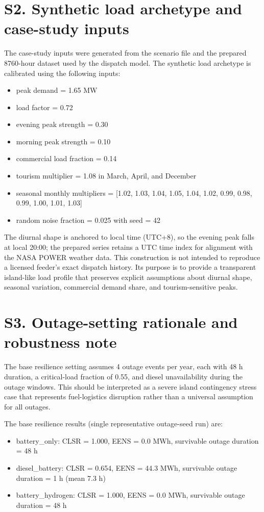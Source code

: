 \documentclass[11pt]{article}
\begin{document}
\section*{S2. Synthetic load archetype and case-study inputs}
The case-study inputs were generated from the scenario file and the prepared 8760-hour dataset used by the dispatch model. The synthetic load archetype is calibrated using the following inputs:
\begin{itemize}[leftmargin=1.5em]
  \item peak demand = 1.65 MW
  \item load factor = 0.72
  \item evening peak strength = 0.30
  \item morning peak strength = 0.10
  \item commercial load fraction = 0.14
  \item tourism multiplier = 1.08 in March, April, and December
  \item seasonal monthly multipliers = [1.02, 1.03, 1.04, 1.05, 1.04, 1.02, 0.99, 0.98, 0.99, 1.00, 1.01, 1.03]
  \item random noise fraction = 0.025 with seed = 42
\end{itemize}

The diurnal shape is anchored to local time (UTC+8), so the evening peak falls at local 20:00; the prepared series retains a UTC time index for alignment with the NASA POWER weather data. This construction is not intended to reproduce a licensed feeder's exact dispatch history. Its purpose is to provide a transparent island-like load profile that preserves explicit assumptions about diurnal shape, seasonal variation, commercial demand share, and tourism-sensitive peaks.

\section*{S3. Outage-setting rationale and robustness note}
The base resilience setting assumes 4 outage events per year, each with 48 h duration, a critical-load fraction of 0.55, and diesel unavailability during the outage windows. This should be interpreted as a severe island contingency stress case that represents fuel-logistics disruption rather than a universal assumption for all outages.

The base resilience results (single representative outage-seed run) are:
\begin{itemize}[leftmargin=1.5em]
  \item battery\_only: CLSR = 1.000, EENS = 0.0 MWh, survivable outage duration = 48 h
  \item diesel\_battery: CLSR = 0.654, EENS = 44.3 MWh, survivable outage duration = 1 h (mean 7.3 h)
  \item battery\_hydrogen: CLSR = 1.000, EENS = 0.0 MWh, survivable outage duration = 48 h
\end{itemize}
\end{document}
